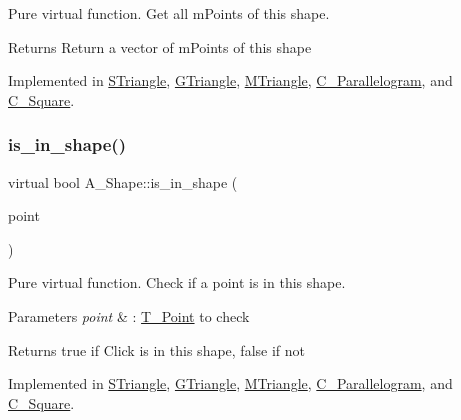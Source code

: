 Pure virtual function. Get all mPoints of this shape.

\begin{DoxyReturn}{Returns}
Return a vector of mPoints of this shape
\end{DoxyReturn}


Implemented in \hyperlink{classSTriangle_a08f667453619b506b5c16745a9aa5ecf}{S\+Triangle}, \hyperlink{classGTriangle_add4581d1b52836142de5817de4d52d17}{G\+Triangle}, \hyperlink{classMTriangle_a90351a097a20d35f9d6c4d05ad881e48}{M\+Triangle}, \hyperlink{classParallelogram_a17c9986712806a8b07d90e444e0a543d}{C_Parallelogram}, and \hyperlink{classSquare_a2a8fb1bfd2f3464cee813ec8b277506e}{C_Square}.

\mbox{\label{classShape_aa09a621da090e42840b4bec7ffb27620}} 
\subsubsection{\texorpdfstring{is\+\_\+in\+\_\+shape()}{is\_in\_shape()}}
{\footnotesize\ttfamily virtual bool A_Shape\+::is\+\_\+in\+\_\+shape (\begin{DoxyParamCaption}\item[{const \hyperlink{classPoint}{T_Point}$<$ double $>$ \&}]{point }\end{DoxyParamCaption})\hspace{0.3cm}{\ttfamily [pure virtual]}}



Pure virtual function. Check if a point is in this shape. 


\begin{DoxyParams}{Parameters}
{\em point} & \+: \hyperlink{classPoint}{T_Point} to check \\
\hline
\end{DoxyParams}
\begin{DoxyReturn}{Returns}
true if Click is in this shape, false if not
\end{DoxyReturn}


Implemented in \hyperlink{classSTriangle_a5b55df6eb4af922521da69f69df77b42}{S\+Triangle}, \hyperlink{classGTriangle_abb6f7243155483cc6de301931e87475a}{G\+Triangle}, \hyperlink{classMTriangle_a4cc4cd63537ead67a0b68d1ab25111b4}{M\+Triangle}, \hyperlink{classParallelogram_a585b14ca0f65ed3a5007e8c1df3c6bc4}{C_Parallelogram}, and \hyperlink{classSquare_ada046df2d9fb92286d106d4b3475980a}{C_Square}.

